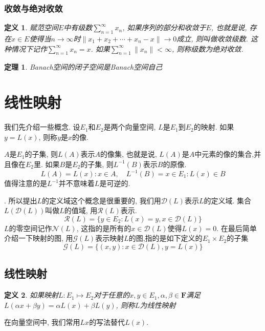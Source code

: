 \documentclass{book}
\newtheorem{definition}{\hspace{2em}定义}[section]
\newtheorem{theorem}{\hspace{2em}定理}[section]
\begin{document}
\subsubsection*{收敛与绝对收敛}
\begin{definition}
  赋范空间$E$中有级数$\sum_{n=1}^{\infty}x_n$, 如果序列的部分和收敛于$E$, 也就是说, 存在$x\in E$使得当$n\to\infty$时$\|x_1+x_2+\cdots+x_n-x\|\to0$成立, 则叫做收敛级数. 这种情况下记作$\sum_{n=1}^{\infty}x_n=x$. 如果$\sum_{n=1}^{\infty}\|x_n\|<\infty$, 则称级数为绝对收敛.
\end{definition}
\begin{theorem}
  Banach空间的闭子空间是Banach空间自己
\end{theorem}
\section{线性映射}
我们先介绍一些概念. 设$E_1$和$E_2$是两个向量空间, $L$是$E_1$到$E_2$的映射. 如果$y=L(x)$, 则称$y$是$x$的像.

$A$是$E_1$的子集, 则$L(A)$表示$A$的像集, 也就是说, $L(A)$是$A$中元素的像的集合,并且像在$E_2$里. 如果$B$是$E_2$的子集, 则$L^{-1}(B)$表示$B$的原像.
\begin{equation*}
  L(A)={L(x):x\in A},\quad L^{-1}(B)={x\in E_1:L(x)\in B}
\end{equation*}
值得注意的是$L^{-1}$并不意味着$L$是可逆的.

. 所以提出$L$的定义域这个概念是很重要的, 我们用$\mathcal{D}(L)$表示$L$的定义域. 集合$L(\mathcal{D}(L))$叫做$L$的值域, 用$\mathcal{R}(L)$表示.
\begin{equation*}
  \mathcal{R}(L)=\{y\in E_2:L(x)=y,x\in\mathcal{D}(L)\}
\end{equation*}
$L$的零空间记作$\mathcal{N}(L)$, 这指的是所有的$x\in \mathcal{D}(L)$使得$L(x)=0$. 在最后简单介绍一下映射的图, 用$\mathcal{G}(L)$表示映射$L$的图,指的是如下定义的$E_1\times E_2$的子集
\begin{equation*}
  \mathcal{G}(L)=\{(x,y):x\in\mathcal{D}(L),y=L(x)\}
\end{equation*}
\subsection*{线性映射}
\begin{definition}
  如果映射$L:E_1\mapsto E_2$对于任意的$x,y\in E_1,\alpha,\beta\in \mathbf{F}$满足$L(\alpha x+\beta y)=\alpha L(x)+\beta L(y)$, 则称$L$为线性映射
\end{definition}
在向量空间中, 我们常用$Lx$的写法替代$L(x)$.
\end{document}
